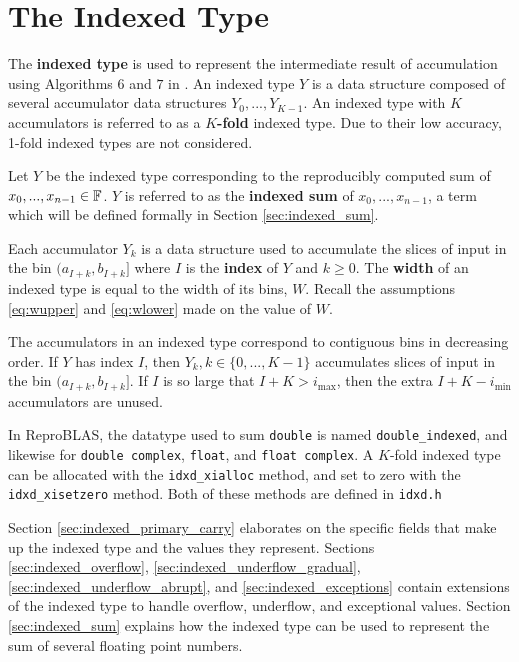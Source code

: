 \section{The Indexed Type}
  \label{sec:indexed}
    The \textbf{indexed type} is used to represent the intermediate result of
    accumulation using Algorithms 6 and $7$ in \cite{repsum}.  An indexed type
    $Y$ is a data structure composed of several accumulator data structures
    $Y_0, ..., Y_{K - 1}$. An indexed type with $K$ accumulators is referred to
    as a \textbf{$K$-fold} indexed type. Due to their low accuracy, 1-fold
    indexed types are not considered.

    Let $Y$ be the indexed type corresponding to the reproducibly computed sum
    of $x_0, ..., x_{n - 1} \in \mathbb{F}$. $Y$ is referred to as the \textbf{indexed
    sum} of $x_0, ..., x_{n - 1}$, a term which will be defined formally in
    Section \ref{sec:indexed_sum}.

    Each accumulator $Y_k$ is a data structure used to accumulate the slices of
    input in the bin $(a_{I + k}, b_{I + k}]$ where $I$ is the \textbf{index}
    of $Y$ and $k \geq 0$. The \textbf{width} of an indexed
    type is equal to the width of its bins, $W$. Recall the assumptions
    \eqref{eq:wupper} and \eqref{eq:wlower} made on the value of $W$.

    The accumulators in an indexed type correspond to contiguous bins in
    decreasing order.     If $Y$ has index $I$, then $Y_k, k \in \{0, ..., K - 1\}$ accumulates slices
    of input in the bin $(a_{I + k}, b_{I + k}]$. If $I$ is so large that
    $I + K > i_{\max}$, then the extra $I + K - i_{\min}$ accumulators are unused.

    In ReproBLAS, the datatype used to sum \texttt{double} is named \texttt{double\_indexed}, and likewise for \texttt{double complex}, \texttt{float}, and \texttt{float complex}. A $K$-fold indexed type can be allocated with the \texttt{idxd\_xialloc} method, and set to zero with the \texttt{idxd\_xisetzero} method. Both of these methods are defined in \texttt{idxd.h}

    Section \ref{sec:indexed_primary_carry} elaborates on the specific fields
    that make up the indexed type and the values they represent. Sections
    \ref{sec:indexed_overflow}, \ref{sec:indexed_underflow_gradual},
    \ref{sec:indexed_underflow_abrupt}, and \ref{sec:indexed_exceptions}
    contain extensions of the indexed type to handle overflow, underflow, and
    exceptional values. Section \ref{sec:indexed_sum} explains how the indexed type can be used to represent the sum of several floating point numbers.

